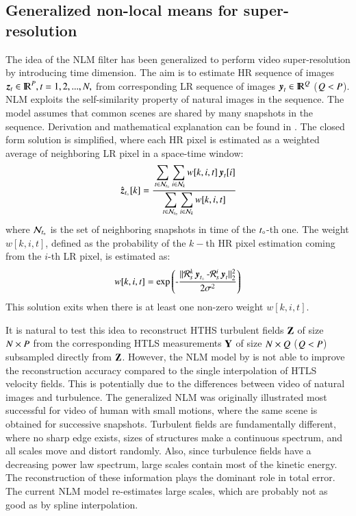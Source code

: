 \subsection{Generalized non-local means for super-resolution}
The idea of the NLM filter has been generalized to perform video super-resolution \citep{protter2009generalizing} by introducing time dimension. The aim is to estimate HR sequence of images $ \operatorname{\boldsymbol{z}}_t \in {\rm I\!R}^{P}, t=1,2,...,N , $ from corresponding LR sequence of images $ \operatorname{\boldsymbol{y}}_t \in {\rm I\!R}^{Q}$ ($ Q <P $). NLM exploits the self-similarity property of natural images in the sequence. The model assumes that common scenes are shared by many snapshots in the sequence. Derivation and mathematical explanation can be found in \citet{protter2009generalizing}. The closed form solution is simplified, where each HR pixel is estimated as a weighted average of neighboring LR pixel in a space-time window:
\begin{equation}
	\hat{\operatorname{\boldsymbol{z}}}_{t_{\circ}}[k]=\cfrac{\displaystyle \sum_{t\in\mathcal{N}_{t_{\circ}}}\sum_{i\in\mathcal{N}_k}w[k,i,t]\operatorname{\boldsymbol{y}}_t[i]}{\displaystyle \sum_{t\in\mathcal{N}_{t_{\circ}}}\sum_{i\in\mathcal{N}_k}w[k,i,t]}
\end{equation}
where $ \mathcal{N}_{t_{\circ}} $ is the set of neighboring snapshots in time of the $ t_{\circ}$-th one. The weight $ w[k,i,t] $, defined as the probability of the $ k- $th HR pixel estimation coming from the $ i $-th LR pixel, is estimated as:
\begin{equation}
	w[k,i,t] = \operatorname{\exp{ \left( -\frac{\ensuremath{\operatorname{\Arrowvert \mathit{\mathcal{R}_s^k\operatorname{\boldsymbol{y}}_{t_{\circ}}-\mathcal{R}_s^i\operatorname{\boldsymbol{y}}_t} \Arrowvert^2_2 }}}{2\sigma^2}\right)}}
\end{equation}
This solution exits when there is at least one non-zero weight $ w[k,i,t] $.

It is natural to test this idea to reconstruct HTHS turbulent fields $ \mathbf{Z} $ of size $ N \times P $ from the corresponding HTLS measurements $ \mathbf{Y} $ of size $ N \times Q $ ($ Q < P $) subsampled directly from $ \mathbf{Z} $. However, the NLM model by \citet{protter2009generalizing} is not able to improve the reconstruction accuracy compared to the single interpolation of HTLS velocity fields. This is potentially due to the differences between video of natural images and turbulence. The generalized NLM was originally illustrated most successful for video of human with small motions, where the same scene is obtained for successive snapshots. Turbulent fields are fundamentally different, where no sharp edge exists, sizes of structures make a continuous spectrum, and all scales move and distort randomly. Also, since turbulence fields have a decreasing power law spectrum, large scales contain most of the kinetic energy. The reconstruction of these information plays the dominant role in total error. The current NLM model re-estimates large scales, which are probably not as good as by spline interpolation. 

